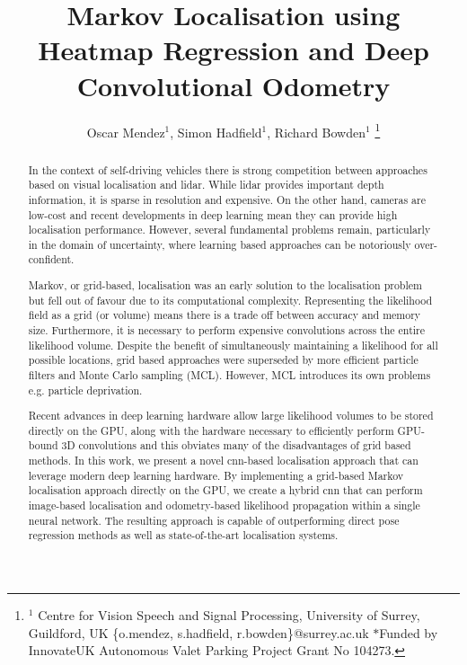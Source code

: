 \documentclass[letterpaper, 10 pt, conference]{ieeeconf}  %
\begin{document}



\title{\LARGE \bf Markov Localisation using Heatmap Regression and Deep Convolutional Odometry} 
\author{Oscar Mendez$^{1}$, Simon Hadfield$^{1}$, Richard Bowden$^{1}$
\thanks{$^{1}$ Centre for Vision Speech and Signal Processing, University of Surrey, Guildford, UK \{o.mendez, s.hadfield, r.bowden\}@surrey.ac.uk \newline
$*$Funded  by  InnovateUK Autonomous Valet Parking Project Grant No 104273.
}}

\maketitle

\begin{abstract}
In the context of self-driving vehicles there is strong competition between approaches based on visual localisation and \ac{lidar}.
While \ac{lidar} provides important depth information, it is sparse in resolution and expensive. On the other hand, cameras are low-cost and recent developments in deep learning mean they can provide high localisation performance. However, several fundamental problems remain, particularly in the domain of uncertainty, where learning based approaches can be notoriously over-confident. 

Markov, or grid-based, localisation was an early solution to the localisation problem but fell out of favour due to its computational complexity. Representing the likelihood field as a grid (or volume) means there is a trade off between accuracy and memory size. Furthermore, it is necessary to perform expensive convolutions across the entire likelihood volume. Despite the benefit of simultaneously maintaining a likelihood for all possible locations, grid based approaches were superseded by more efficient particle filters and Monte Carlo sampling (MCL). However, MCL introduces its own problems e.g. particle deprivation. 

Recent advances in deep learning hardware allow large likelihood volumes to be stored directly on the GPU, along with the hardware necessary to efficiently perform GPU-bound 3D convolutions and this obviates many of the disadvantages of grid based methods. In this work, we present a novel \acs{cnn}-based localisation approach that can leverage modern deep learning hardware.
By implementing a grid-based Markov localisation approach directly on the GPU, we create a hybrid \ac{cnn} that can perform image-based localisation and odometry-based likelihood propagation within a single neural network.
The resulting approach is capable of outperforming direct pose regression methods as well as state-of-the-art localisation systems.
\end{abstract}
\end{document}
